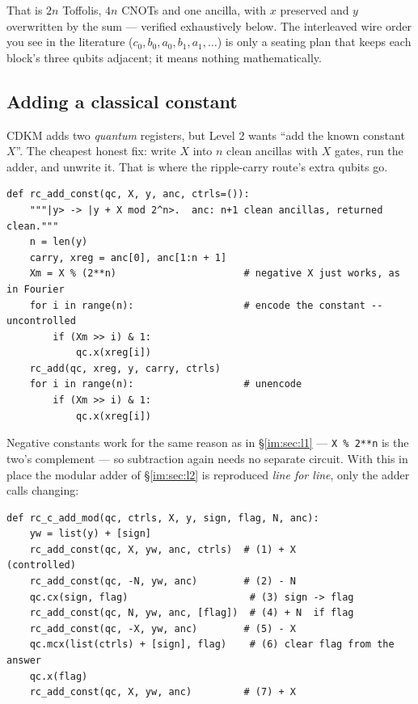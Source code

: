 \documentclass[11pt]{article}
\newcommand{\code}[1]{\texttt{#1}}
\theoremstyle{plain}
\theoremstyle{remark}
\begin{document}
\noindent
That is $2n$ Toffolis, $4n$ CNOTs and one ancilla, with $x$ preserved and $y$ overwritten by the
sum --- verified exhaustively below. The interleaved wire order you see in the literature
($c_0,b_0,a_0,b_1,a_1,\dots$) is only a seating plan that keeps each block's three qubits adjacent;
it means nothing mathematically.

\subsection{Adding a classical constant}

CDKM adds two \emph{quantum} registers, but Level 2 wants ``add the known constant $X$''. The
cheapest honest fix: write $X$ into $n$ clean ancillas with $X$ gates, run the adder, and unwrite
it. That is where the ripple-carry route's extra qubits go.

\begin{lstlisting}
def rc_add_const(qc, X, y, anc, ctrls=()):
    """|y> -> |y + X mod 2^n>.  anc: n+1 clean ancillas, returned clean."""
    n = len(y)
    carry, xreg = anc[0], anc[1:n + 1]
    Xm = X % (2**n)                      # negative X just works, as in Fourier
    for i in range(n):                   # encode the constant -- uncontrolled
        if (Xm >> i) & 1:
            qc.x(xreg[i])
    rc_add(qc, xreg, y, carry, ctrls)
    for i in range(n):                   # unencode
        if (Xm >> i) & 1:
            qc.x(xreg[i])
\end{lstlisting}

\noindent
Negative constants work for the same reason as in \S\ref{im:sec:l1} --- \code{X \% 2**n} is the two's
complement --- so subtraction again needs no separate circuit. With this in place the modular adder
of \S\ref{im:sec:l2} is reproduced \emph{line for line}, only the adder calls changing:

\begin{lstlisting}
def rc_c_add_mod(qc, ctrls, X, y, sign, flag, N, anc):
    yw = list(y) + [sign]
    rc_add_const(qc, X, yw, anc, ctrls)  # (1) + X          (controlled)
    rc_add_const(qc, -N, yw, anc)        # (2) - N
    qc.cx(sign, flag)                     # (3) sign -> flag
    rc_add_const(qc, N, yw, anc, [flag])  # (4) + N  if flag
    rc_add_const(qc, -X, yw, anc)        # (5) - X
    qc.mcx(list(ctrls) + [sign], flag)    # (6) clear flag from the answer
    qc.x(flag)
    rc_add_const(qc, X, yw, anc)         # (7) + X
\end{lstlisting}
\end{document}
